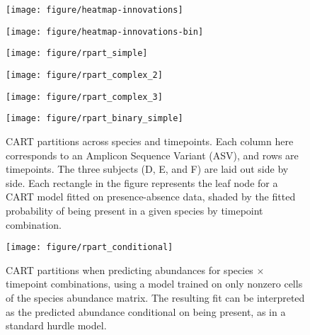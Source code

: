 \documentclass[14pt]{extarticle}
\begin{document}
\begin{figure}
  \centering
  \texttt{[image: figure/heatmap-innovations]}
  \caption{\label{fig:heatmap-innovations} }
\end{figure}

\begin{figure}
  \centering
  \texttt{[image: figure/heatmap-innovations-bin]}
  \caption{\label{fig:heatmap-innovations-bin} }
\end{figure}


\begin{figure}
  \centering
  \texttt{[image: figure/rpart\_simple]}
  \caption{\label{fig:rpart_simple} }
\end{figure}

\begin{figure}
  \centering
  \texttt{[image: figure/rpart\_complex\_2]}
  \caption{\label{fig:label} }
\end{figure}

\begin{figure}
  \centering
  \texttt{[image: figure/rpart\_complex\_3]}
  \caption{\label{fig:rpart_complex_3} }
\end{figure}

\begin{figure}
  \centering
  \texttt{[image: figure/rpart\_binary\_simple]}
  \caption{CART partitions across species and timepoints. Each column here
    corresponds to an Amplicon Sequence Variant (ASV), and rows are timepoints.
    The three subjects (D, E, and F) are laid out side by side. Each rectangle
    in the figure represents the leaf node for a CART model fitted on
    presence-absence data, shaded by the fitted probability of being present in
    a given species by timepoint combination.
    \label{fig:rpart_binary_simple}}
\end{figure}

\begin{figure}
  \centering
  \texttt{[image: figure/rpart\_conditional]}
  \caption{CART partitions when predicting abundances for species $\times$
    timepoint combinations, using a model trained on only nonzero cells of the
    species abundance matrix. The resulting fit can be interpreted as the
    predicted abundance conditional on being present, as in a standard hurdle
    model. \label{fig:rpart_conditional} }
\end{figure}
\end{document}
